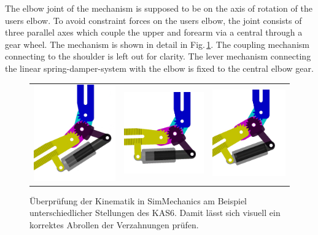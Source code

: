 \documentclass[letterpaper, 10 pt, conference]{ieeeconf}  %
\begin{document}
The elbow joint of the mechanism is supposed to be on the axis of rotation of the users elbow.
To avoid constraint forces on the users elbow, the joint consists of three parallel axes which couple the upper and forearm via a central  through a gear wheel. The mechanism is shown in detail in Fig.\,\ref{fig:EllenbogenSimMech}.
The coupling mechanism connecting to the shoulder is left out for clarity.
The lever mechanism connecting the linear spring-damper-system with the elbow is fixed to the central elbow gear.

\begin{figure}[tb!]
    \begin{tabular}{c c c}
        \includegraphics[width=0.28\linewidth]{figures/KAS6m3_SimMech_1.png} &
        \includegraphics[width=0.30\linewidth]{figures/KAS6m3_SimMech_2.png} &
        \includegraphics[width=0.28\linewidth]{figures/KAS6m3_SimMech_3.png}
    \end{tabular}

    \caption[Überprüfung der Kinematik in SimMechanics]{Überprüfung der Kinematik in SimMechanics am Beispiel unterschiedlicher Stellungen des KAS6. Damit lässt sich visuell ein korrektes Abrollen der Verzahnungen prüfen.}
    \label{fig:EllenbogenSimMech}
\end{figure} 
\end{document}
